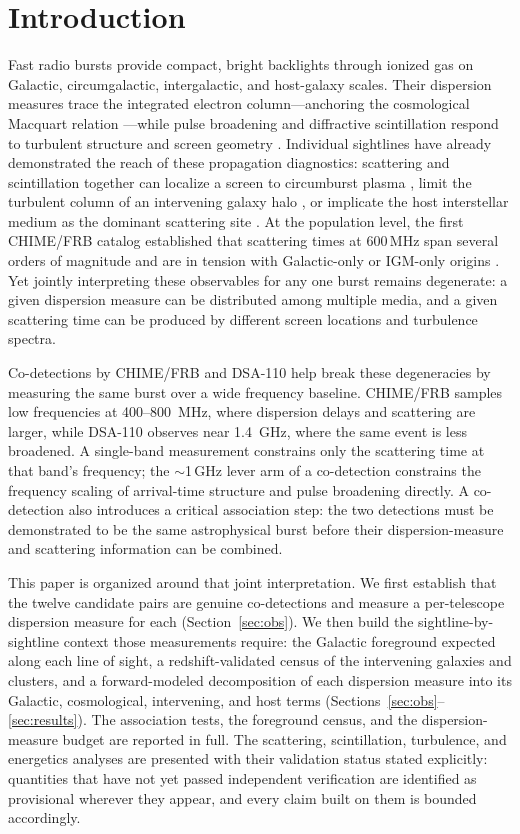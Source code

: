 \section{Introduction}
\label{sec:intro}

Fast radio bursts \citep[FRBs;][]{Lorimer2007, Thornton2013} provide compact,
bright backlights through ionized gas on Galactic, circumgalactic,
intergalactic, and host-galaxy scales. Their dispersion measures trace the
integrated electron column---anchoring the cosmological Macquart relation
\citep{Macquart2020}---while pulse broadening and diffractive scintillation
respond to turbulent structure and screen geometry
\citep[e.g.,][]{CordesChatterjee2019}. Individual sightlines have already
demonstrated the reach of these propagation diagnostics: scattering and
scintillation together can localize a screen to circumburst plasma
\citep{Masui2015}, limit the turbulent column of an intervening galaxy halo
\citep{Prochaska2019, Ocker2021}, or implicate the host interstellar medium as
the dominant scattering site \citep{Ocker2022}. At the population level, the
first CHIME/FRB catalog established that scattering times at 600\,MHz span
several orders of magnitude and are in tension with Galactic-only or IGM-only
origins \citep{CHIME2021Catalog, Chawla2022}. Yet jointly interpreting these
observables for any one burst remains degenerate: a given dispersion measure
can be distributed among multiple media, and a given scattering time can be
produced by different screen locations and turbulence spectra.

Co-detections by CHIME/FRB and DSA-110 help break these degeneracies by
measuring the same burst over a wide frequency baseline. CHIME/FRB samples
low frequencies at 400--800~MHz, where dispersion delays and scattering are
larger, while DSA-110 observes near 1.4~GHz, where the same event is less
broadened. A single-band measurement constrains only the scattering time at
that band's frequency; the $\sim$1\,GHz lever arm of a co-detection
constrains the frequency scaling of arrival-time structure and pulse
broadening directly. A co-detection
also introduces a critical association step: the two detections must be
demonstrated to be the same astrophysical burst before their
dispersion-measure and scattering information can be combined.

This paper is organized around that joint interpretation. We first establish
that the twelve candidate pairs are genuine co-detections and measure a
per-telescope dispersion measure for each (Section~\ref{sec:obs}). We then
build the sightline-by-sightline context those measurements require: the
Galactic foreground expected along each line of sight, a redshift-validated
census of the intervening galaxies and clusters, and a forward-modeled
decomposition of each dispersion measure into its Galactic, cosmological,
intervening, and host terms (Sections~\ref{sec:obs}--\ref{sec:results}). The
association tests, the foreground census, and the dispersion-measure budget
are reported in full. The scattering, scintillation, turbulence, and
energetics analyses are presented with their validation status stated
explicitly: quantities that have not yet passed independent verification are
identified as provisional wherever they appear, and every claim built on them
is bounded accordingly.
